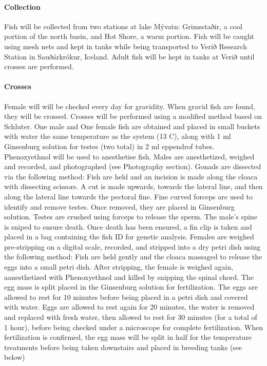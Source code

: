 \documentclass[12pt]{extarticle}
\begin{document}
\paragraph{Collection}
Fish will be collected from two stations at lake M\'yvatn: Grimsstaðir, a cool portion of the north basin, and Hot Shore, a warm portion. Fish will be caught using mesh nets and kept in tanks while being transported to Verið Research Station in Sauðárkrókur, Iceland. Adult fish will be kept in tanks at Verið until crosses are performed.

\paragraph{Crosses}
Female will will be checked every day for gravidity. When gravid fish are found, they will be crossed.
Crosses will be performed using a modified method based on Schluter. One male and One female fish are obtained and placed in small buckets with water the same temperature as the system (13 \degree C), along with 1 ml Ginsenburg solution for testes (two total) in 2 ml eppendrof tubes. Phenoxyethnol will be used to anesthetise fish. Males are anesthetized, weighed and recorded, and photographed (see Photography section). Gonads are dissected via the following method:
Fish are held and an incision is made along the cloaca with dissecting scissors. A cut is made upwards, towards the lateral line, and then along the lateral line towards the pectoral fine. Fine curved forceps are used to identify and remove testes. Once removed, they are placed in Ginsenburg solution.
Testes are crushed using forceps to release the sperm. The male's spine is sniped to ensure death. Once death has been ensured, a fin clip is taken and placed in a bag containing the fish ID for genetic analysis.
Females are weighed pre-stripping on a digital scale, recorded, and stripped into a dry petri dish using the following method:
Fish are held gently and the cloaca massaged to release the eggs into a small petri dish. After stripping, the female is weighed again, aanesthetized with Phenoxyethnol and killed by snipping the spinal chord. The egg mass is split placed in the Ginsenburg solution for fertilization.
 The eggs are allowed to rest for 10 minutes before being placed in a petri dish and covered with water. Eggs are allowed to rest again for 20 minutes, the water is removed and replaced with fresh water, then allowed to rest for 30 minutes (for a total of 1 hour), before being checked under a microscope for complete fertilization. When fertilization is confirmed, the egg mass will be split in half for the temperature treatments before being taken downstairs and placed in breeding tanks (see below)
 
\end{document}
